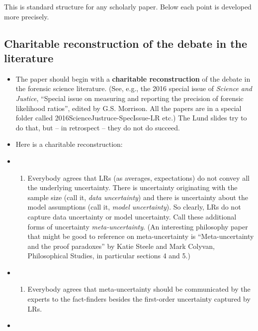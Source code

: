 \documentclass[
  10pt,
  dvipsnames,enabledeprecatedfontcommands]{scrartcl}
\providecommand{\tightlist}{%
  \setlength{\itemsep}{0pt}\setlength{\parskip}{0pt}}
\begin{document}
This is standard structure for any scholarly paper. Below each point is
developed more precisely.

\hypertarget{charitable-reconstruction-of-the-debate-in-the-literature}{%
\subsection{Charitable reconstruction of the debate in the
literature}\label{charitable-reconstruction-of-the-debate-in-the-literature}}

\begin{itemize}
\item
  The paper should begin with a \textbf{charitable reconstruction} of
  the debate in the forensic science literature. (See, e.g., the 2016
  special issue of \emph{Science and Justice}, ``Special issue on
  measuring and reporting the precision of forensic likelihood ratios'',
  edited by G.S. Morrison. All the papers are in a special folder called
  2016ScienceJustruce-SpecIssue-LR etc.) The Lund slides try to do that,
  but -- in retrospect -- they do not do succeed.
\item
  Here is a charitable reconstruction:
\item
  \begin{enumerate}
  \def\labelenumi{(\roman{enumi})}
  \tightlist
  \item
    Everybody agrees that LRs (as averages, expectations) do not convey
    all the underlying uncertainty. There is uncertainty originating
    with the sample size (call it, \emph{data uncertainty}) and there is
    uncertainty about the model assumptions (call it, \emph{model
    uncertainty}). So clearly, LRs do not capture data uncertainty or
    model uncertainty. Call these additional forms of uncertainty
    \emph{meta-uncertainty}. (An interesting philosophy paper that might
    be good to reference on meta-uncertainty is ``Meta-uncertainty and
    the proof paradoxes'' by Katie Steele and Mark Colyvan,
    Philosophical Studies, in particular sections 4 and 5.)
  \end{enumerate}
\item
  \begin{enumerate}
  \def\labelenumi{(\roman{enumi})}
  \setcounter{enumi}{1}
  \tightlist
  \item
    Everybody agrees that meta-uncertainty should be communicated by the
    experts to the fact-finders besides the first-order uncertainty
    captured by LRs.
  \end{enumerate}
\item

\end{itemize}
\end{document}
